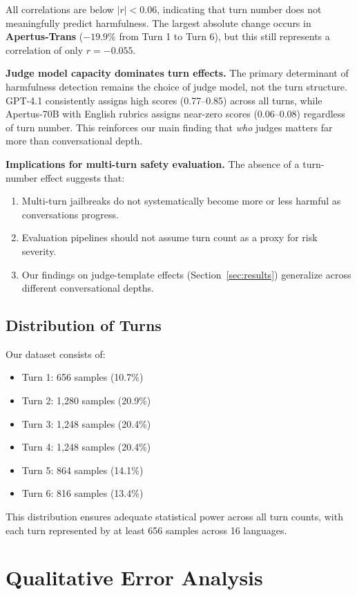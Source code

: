All correlations are below $|r| < 0.06$, indicating that turn number does not meaningfully predict harmfulness. The largest absolute change occurs in \textbf{Apertus-Trans} ($-19.9\%$ from Turn 1 to Turn 6), but this still represents a correlation of only $r=-0.055$.

\textbf{Judge model capacity dominates turn effects.} The primary determinant of harmfulness detection remains the choice of judge model, not the turn structure. GPT-4.1 consistently assigns high scores (0.77--0.85) across all turns, while Apertus-70B with English rubrics assigns near-zero scores (0.06--0.08) regardless of turn number. This reinforces our main finding that \emph{who} judges matters far more than conversational depth.

\textbf{Implications for multi-turn safety evaluation.} The absence of a turn-number effect suggests that:
\begin{enumerate}
    \item Multi-turn jailbreaks do not systematically become more or less harmful as conversations progress.
    \item Evaluation pipelines should not assume turn count as a proxy for risk severity.
    \item Our findings on judge-template effects (Section~\ref{sec:results}) generalize across different conversational depths.
\end{enumerate}

\subsection{Distribution of Turns}

Our dataset consists of:
\begin{itemize}
    \item Turn 1: 656 samples (10.7\%)
    \item Turn 2: 1,280 samples (20.9\%)
    \item Turn 3: 1,248 samples (20.4\%)
    \item Turn 4: 1,248 samples (20.4\%)
    \item Turn 5: 864 samples (14.1\%)
    \item Turn 6: 816 samples (13.4\%)
\end{itemize}

This distribution ensures adequate statistical power across all turn counts, with each turn represented by at least 656 samples across 16 languages.

\section{Qualitative Error Analysis}
\label{app:qualitative}


